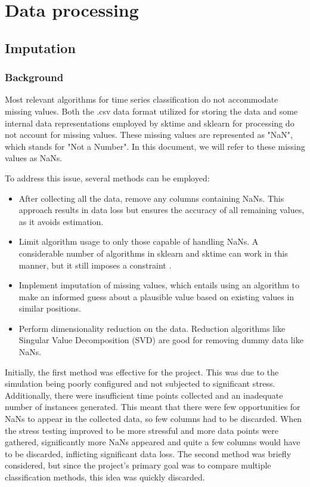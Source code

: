 \chapter{Data processing}

\section{Imputation}

\subsection{Background}
Most relevant algorithms for time series classification do not accommodate missing values. Both the .csv data format utilized for storing the data and some internal data representations employed by sktime and sklearn for processing do not account for missing values. These missing values are represented as "NaN", which stands for "Not a Number". In this document, we will refer to these missing values as NaNs.

To address this issue, several methods can be employed:
\begin{itemize}
    \item After collecting all the data, remove any columns containing NaNs. This approach results in data loss but ensures the accuracy of all remaining values, as it avoids estimation.
    \item Limit algorithm usage to only those capable of handling NaNs. A considerable number of algorithms in sklearn and sktime can work in this manner, but it still imposes a constraint \cite*{Scikit-learn-imputation}.
    \item Implement imputation of missing values, which entails using an algorithm to make an informed guess about a plausible value based on existing values in similar positions.
    \item Perform dimensionality reduction on the data. Reduction algorithms like Singular Value Decomposition (SVD) are good for removing dummy data like NaNs.
\end{itemize}

Initially, the first method was effective for the project. This was due to the simulation being poorly configured and not subjected to significant stress. Additionally, there were insufficient time points collected and an inadequate number of instances generated. This meant that there were few opportunities for NaNs to appear in the collected data, so few columns had to be discarded. When the stress testing improved to be more stressful and more data points were gathered, significantly more NaNs appeared and quite a few columns would have to be discarded, inflicting significant data loss.
The second method was briefly considered, but since the project's primary goal was to compare multiple classification methods, this idea was quickly discarded.

